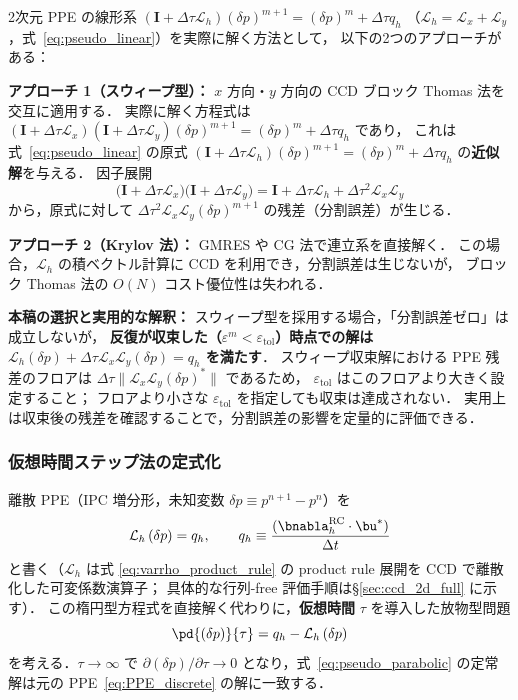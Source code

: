 \begin{tcolorbox}[warnbox, title={2次元求解における実装方法と分割誤差について}]
\label{warn:ppe_splitting}
2次元 PPE の線形系 $(\mathbf{I} + \Delta\tau\mathcal{L}_h)(\delta p)^{m+1} = (\delta p)^m + \Delta\tau q_h$
（$\mathcal{L}_h = \mathcal{L}_x + \mathcal{L}_y$，式~\eqref{eq:pseudo_linear}）を実際に解く方法として，
以下の2つのアプローチがある：

\textbf{アプローチ 1（スウィープ型）：} $x$ 方向・$y$ 方向の CCD ブロック Thomas 法を交互に適用する．
実際に解く方程式は $(\mathbf{I}+\Delta\tau\mathcal{L}_x)(\mathbf{I}+\Delta\tau\mathcal{L}_y)(\delta p)^{m+1} = (\delta p)^m + \Delta\tau q_h$ であり，
これは式~\eqref{eq:pseudo_linear} の原式 $(\mathbf{I}+\Delta\tau\mathcal{L}_h)(\delta p)^{m+1} = (\delta p)^m + \Delta\tau q_h$ の\textbf{近似解}を与える．
因子展開
\[
  \bigl(\mathbf{I}+\Delta\tau\mathcal{L}_x\bigr)\bigl(\mathbf{I}+\Delta\tau\mathcal{L}_y\bigr)
  = \mathbf{I} + \Delta\tau\mathcal{L}_h + \Delta\tau^2\mathcal{L}_x\mathcal{L}_y
\]
から，原式に対して $\Delta\tau^2\mathcal{L}_x\mathcal{L}_y(\delta p)^{m+1}$ の残差（分割誤差）が生じる．

\textbf{アプローチ 2（Krylov 法）：} GMRES や CG 法で連立系を直接解く．
この場合，$\mathcal{L}_h$ の積ベクトル計算に CCD を利用でき，分割誤差は生じないが，
ブロック Thomas 法の $O(N)$ コスト優位性は失われる．

\textbf{本稿の選択と実用的な解釈：}
スウィープ型を採用する場合，「分割誤差ゼロ」は成立しないが，
\textbf{反復が収束した（$\varepsilon^m < \varepsilon_\text{tol}$）時点での解は $\mathcal{L}_h(\delta p) + \Delta\tau\mathcal{L}_x\mathcal{L}_y(\delta p) = q_h$ を満たす}．
スウィープ収束解における PPE 残差のフロアは $\Delta\tau\|\mathcal{L}_x\mathcal{L}_y(\delta p)^*\|$ であるため，
$\varepsilon_\text{tol}$ はこのフロアより大きく設定すること；
フロアより小さな $\varepsilon_\text{tol}$ を指定しても収束は達成されない．
実用上は収束後の残差を確認することで，分割誤差の影響を定量的に評価できる．
\end{tcolorbox}

\subsubsection{仮想時間ステップ法の定式化}
\label{sec:pseudo_formulation}

離散 PPE（IPC 増分形，未知変数 $\delta p \equiv p^{n+1}-p^n$）を
\begin{equation}
  \mathcal{L}_h\,(\delta p) = q_h,
  \qquad
  q_h \equiv \frac{(\bnabla_h^{\mathrm{RC}}\cdot\bu^*)}{\Delta t}
  \label{eq:PPE_discrete}
\end{equation}
と書く（$\mathcal{L}_h$ は式 \eqref{eq:varrho_product_rule} の product rule 展開を CCD で離散化した可変係数演算子；
具体的な行列-free 評価手順は§\ref{sec:ccd_2d_full} に示す）．
この楕円型方程式を直接解く代わりに，\textbf{仮想時間} $\tau$ を導入した放物型問題
\begin{equation}
  \pd{(\delta p)}{\tau} = q_h - \mathcal{L}_h\,(\delta p)
  \label{eq:pseudo_parabolic}
\end{equation}
を考える．$\tau\to\infty$ で $\partial(\delta p)/\partial\tau \to 0$ となり，式~\eqref{eq:pseudo_parabolic} の定常解は元の PPE~\eqref{eq:PPE_discrete} の解に一致する．

